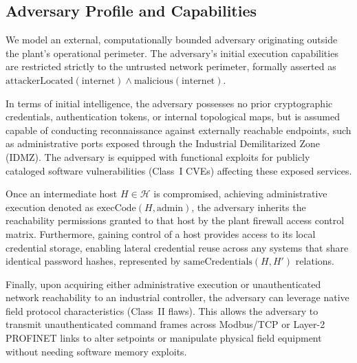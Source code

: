 \documentclass[target=mst,aauheader=aics,style=]{thud}
\begin{document}
\subsection{Adversary Profile and Capabilities}
We model an external, computationally bounded adversary originating outside the plant's operational perimeter. The adversary's initial execution capabilities are restricted strictly to the untrusted network perimeter, formally asserted as $\text{attackerLocated}(\text{internet}) \land \text{malicious}(\text{internet})$. 

In terms of initial intelligence, the adversary possesses no prior cryptographic credentials, authentication tokens, or internal topological maps, but is assumed capable of conducting reconnaissance against externally reachable endpoints, such as administrative ports exposed through the Industrial Demilitarized Zone (IDMZ). The adversary is equipped with functional exploits for publicly cataloged software vulnerabilities (Class~I CVEs) affecting these exposed services. 

Once an intermediate host $H \in \mathcal{H}$ is compromised, achieving administrative execution denoted as $\text{execCode}(H, \text{admin})$, the adversary inherits the reachability permissions granted to that host by the plant firewall access control matrix. Furthermore, gaining control of a host provides access to its local credential storage, enabling lateral credential reuse across any systems that share identical password hashes, represented by $\text{sameCredentials}(H, H')$ relations. 

Finally, upon acquiring either administrative execution or unauthenticated network reachability to an industrial controller, the adversary can leverage native field protocol characteristics (Class~II flaws). This allows the adversary to transmit unauthenticated command frames across Modbus/TCP or Layer-2 PROFINET links to alter setpoints or manipulate physical field equipment without needing software memory exploits.
\end{document}
